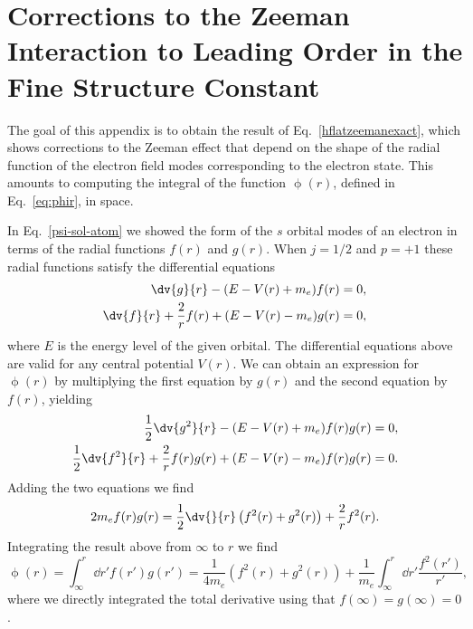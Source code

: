 \chapter{Corrections to the Zeeman Interaction to Leading Order in the Fine Structure Constant}\label{app:derivation}


The goal of this appendix is to obtain the result of Eq.~\eqref{hflatzeemanexact}, which shows corrections to the Zeeman effect that depend on the shape of the radial function of the electron field modes corresponding to the electron state. This amounts to computing the integral of the function $\upphi(r)$, defined in Eq.~\eqref{eq:phir}, in space.

In Eq.~\eqref{psi-sol-atom} we showed the form of the $s$ orbital modes of an electron in terms of the radial functions $f(r)$ and $g(r)$. When $j=1/2$ and $p=+1$ these radial functions satisfy the differential equations~\cite{RQMgreiner}
\begin{align}
    \dv{g}{r} - (E-V(r)+m_e)f(r) &= 0,\\
    \dv{f}{r} +\frac{2}{r} f(r) + (E-V(r)-m_e)g(r) &= 0,
\end{align}
where $E$ is the energy level of the given orbital. The differential equations above are valid for any central potential $V(r)$. We can obtain an expression for $\upphi(r)$ by multiplying the first equation by $g(r)$ and the second equation by $f(r)$, yielding
\begin{align}
    \frac{1}{2}\dv{g^2}{r} - (E-V(r)+m_e)f(r)g(r) &= 0,\\
    \frac{1}{2}\dv{f^2}{r} +\frac{2}{r} f(r)g(r) + (E-V(r)-m_e)f(r)g(r) &= 0.
\end{align}
Adding the two equations we find
\begin{align}
    2m_e f(r) g(r) = \frac{1}{2}\dv{}{r}\left(f^2(r) + g^2(r)\right)+ \frac{2}{r} f^2(r).
\end{align}
Integrating the result above from $\infty$ to $r$ we find
\begin{equation}
    \upphi(r) = \int_{\infty}^r \dd r' f(r') g(r') = \frac{1}{4m_e}(f^2(r) + g^2(r)) + \frac{1}{m_e} \int_\infty^r \dd r' \frac{f^2(r')}{r'},
\end{equation}
where we directly integrated the total derivative using that $f(\infty) = g(\infty) = 0$. 

